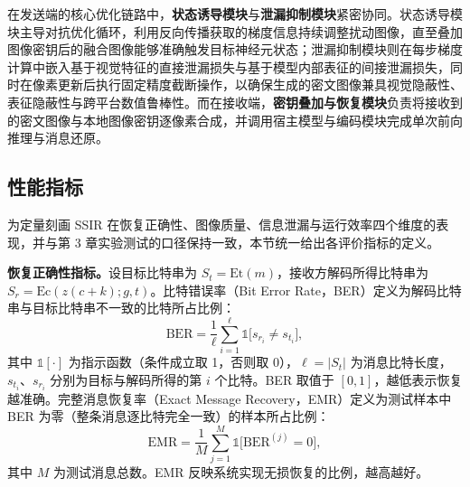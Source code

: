 在发送端的核心优化链路中，\textbf{状态诱导模块}与\textbf{泄漏抑制模块}紧密协同。状态诱导模块主导对抗优化循环，利用反向传播获取的梯度信息持续调整扰动图像，直至叠加图像密钥后的融合图像能够准确触发目标神经元状态；泄漏抑制模块则在每步梯度计算中嵌入基于视觉特征的直接泄漏损失与基于模型内部表征的间接泄漏损失，同时在像素更新后执行固定精度截断操作，以确保生成的密文图像兼具视觉隐蔽性、表征隐蔽性与跨平台数值鲁棒性。而在接收端，\textbf{密钥叠加与恢复模块}负责将接收到的密文图像与本地图像密钥逐像素合成，并调用宿主模型与编码模块完成单次前向推理与消息还原。

\subsection{性能指标}
为定量刻画 SSIR 在恢复正确性、图像质量、信息泄漏与运行效率四个维度的表现，并与第 3 章实验测试的口径保持一致，本节统一给出各评价指标的定义。

\textbf{恢复正确性指标。}设目标比特串为 \(S_t=\mathrm{Et}(m)\)，接收方解码所得比特串为 \(S_r=\mathrm{Ec}(z(c+k);g,t)\)。比特错误率（Bit Error Rate，BER）定义为解码比特串与目标比特串不一致的比特所占比例：
\begin{equation}
    \mathrm{BER} = \frac{1}{\ell}\sum_{i=1}^{\ell}\mathbb{1}\big[s_{r_i}\neq s_{t_i}\big],
    \label{eq:ber}
\end{equation}
其中 \(\mathbb{1}[\cdot]\) 为指示函数（条件成立取 1，否则取 0），\(\ell=|S_t|\) 为消息比特长度，\(s_{t_i}\)、\(s_{r_i}\) 分别为目标与解码所得的第 \(i\) 个比特。BER 取值于 \([0,1]\)，越低表示恢复越准确。完整消息恢复率（Exact Message Recovery，EMR）定义为测试样本中 BER 为零（整条消息逐比特完全一致）的样本所占比例：
\begin{equation}
    \mathrm{EMR} = \frac{1}{M}\sum_{j=1}^{M}\mathbb{1}\big[\mathrm{BER}^{(j)}=0\big],
    \label{eq:emr}
\end{equation}
其中 \(M\) 为测试消息总数。EMR 反映系统实现无损恢复的比例，越高越好。

